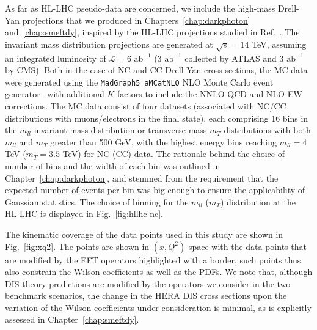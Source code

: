 \documentclass[withindex,glossary]{cam-thesis}
\begin{document}
As far as HL-LHC pseudo-data are concerned, we include the high-mass Drell-Yan projections that we produced in
Chapters~\ref{chap:darkphoton} and~\ref{chap:smeftdy}, inspired by the HL-LHC projections studied
in Ref.~\cite{AbdulKhalek:2018rok}. The invariant mass distribution
projections are generated at \(\sqrt{s} = 14\) TeV, assuming an
integrated luminosity of \(\mathcal{L} = 6 \text{ ab}^{-1}\) (\(3 \text{ ab}^{-1}\) collected by ATLAS and  \(3
\text{ ab}^{-1}\) by CMS).
%
Both in the case of NC and CC Drell-Yan cross sections, the MC data
were generated using the {\tt MadGraph5\_aMCatNLO} NLO Monte Carlo event
generator~\cite{Frederix:2018nkq} with additional $K$-factors to include the NNLO QCD and
NLO EW corrections. The MC data consist of four datasets
(associated with NC/CC distributions with muons/electrons in the final
state), each comprising 16 bins in the $m_{ll}$
invariant mass distribution or transverse mass $m_T$ distributions
with both $m_{ll}$ and $m_T$ greater than 500 GeV, with the highest energy bins reaching $m_{ll}=4$
TeV ($m_T=3.5$ TeV) for NC (CC) data.
The rationale behind the choice of number of bins and the width of each bin was outlined 
in Chapter~\ref{chap:darkphoton}, and stemmed from the requirement that the expected number of events
per bin was big enough to ensure the applicability of Gaussian
statistics. The choice of binning for the $m_{ll}$ ($m_T$) distribution at the
HL-LHC is displayed in Fig.~\ref{fig:hllhc-nc}.

The kinematic coverage of the data points used in
this study are shown in Fig.~\ref{fig:xq2}. The points are shown
in \((x,Q^2)\) space with the data points that are modified by the EFT operators
highlighted with a border, such points thus also constrain the Wilson
coefficients as well as the PDFs. We note that, although DIS theory predictions are
modified by the operators we consider in the two benchmark scenarios,
the change in the HERA DIS cross sections upon the variation of the Wilson
coefficients under consideration is minimal, as is explicitly assessed in Chapter~\ref{chap:smeftdy}.
\end{document}
